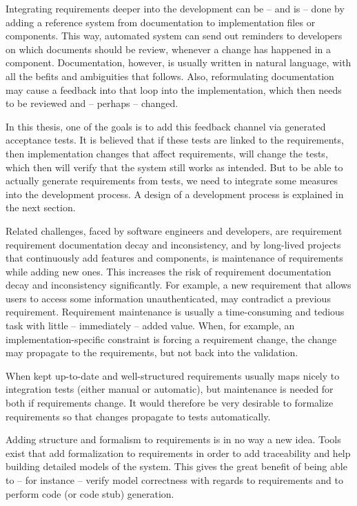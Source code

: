 \noindent Integrating requirements deeper into the development can be -- and is -- done by adding a reference system from documentation to implementation files or components. This way, automated system can send out reminders to developers on which documents should be review, whenever a change has happened in a component.
Documentation, however, is usually written in natural language, with all the befits and ambiguities that follows. Also, reformulating documentation may cause a feedback into that loop into the implementation, which then needs to be reviewed and -- perhaps -- changed.\bigskip

\noindent In this thesis, one of the goals is to add this feedback channel via generated acceptance tests. It is believed that if these tests are linked to the requirements, then implementation changes that affect requirements, will change the tests, which then will verify that the system still works as intended. But to be able to actually generate requirements from tests, we need to integrate some measures into the development process. A design of a development process is explained in the next section.\bigskip

\noindent Related challenges, faced by software engineers and developers, are requirement requirement documentation decay and inconsistency, and  by long-lived projects that continuously add features and components, is maintenance of requirements while adding new ones. This increases the risk of requirement documentation decay and inconsistency significantly. For example, a new requirement that allows users to access some information unauthenticated, may contradict a previous requirement.
Requirement maintenance is usually a time-consuming and tedious task with little -- immediately -- added value. When, for example, an implementation-specific constraint is forcing a requirement change, the change may propagate to the requirements, but not back into the validation.\medskip

\noindent When kept up-to-date and well-structured requirements usually maps nicely to integration tests (either manual or automatic), but maintenance is needed for both if requirements change. It would therefore be very desirable to formalize requirements so that changes propagate to tests automatically.\medskip

\noindent Adding structure and formalism to requirements is in no way a new idea. Tools exist that add formalization to requirements in order to add traceability and help building detailed models of the system. This gives the great benefit of being able to -- for instance -- verify model correctness with regards to requirements and to perform code (or code stub) generation.\smallskip

